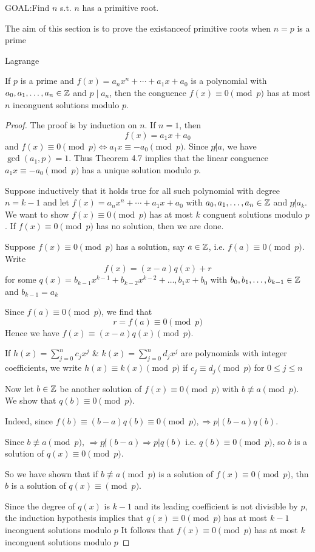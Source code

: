 GOAL:\@ Find $n$ s.t. $n$ has a primitive root.

The aim of this section is to prove the existanceof primitive roots 
when $n = p$ is a prime

\setcounter{theorem}{0}
\begin{theorem}
    Lagrange

    If $p$ is a prime and $f(x) = a_n x^n + \cdots + a_1x + a_0$
    is a polynomial with $a_0, a_1, \dots, a_n \in \mathbb{Z}$ and $p\;|\;a_n$, 
    then the conguence $f(x) \equiv 0 \pmod p$ has at most $n$ inconguent 
    solutions modulo $p$.
\end{theorem}
\begin{proof}
    The proof is by induction on $n$. If $n = 1$, then 
    \[
        f(x) = a_1 x + a_0
    \]
    and $f(x) \equiv 0 \pmod p \iff a_1 x \equiv -a_0 \pmod p$.
    Since $\displaystyle p \not| a$, we have $\gcd(a_1, p) = 1$. Thus
    Theorem 4.7 implies that the linear conguence $a_1 x\equiv -a_0 \pmod p$
    has a unique solution modulo $p$.

    Suppose inductively that it holds true for all such polynomial with degree $n = k-1$
    and let $f(x) = a_n x^n + \cdots + a_1x + a_0$ with $a_0, a_1, \dots, a_n \in \mathbb{Z}$ and
    $p \not| a_k$. We want to show $f(x) \equiv 0 \pmod p$ has at most $k$ conguent solutions
    modulo $p$.
    If $f(x) \equiv 0 \pmod p$ has no solution, then we are done.

    Suppose $f(x) \equiv 0 \pmod p$ has a solution, say $a \in \mathbb{Z}$, i.e. $f(a) \equiv 0 \pmod p$.
    Write
    \[
        f(x) = (x-a)q(x) + r
    \]
    for some $q(x) = b_{k-1} x^{k-1} + b_{k-2} x^{k-2} + \dots, b_1 x + b_0$
    with $b_0, b_1, \dots, b_{k-1} \in \mathbb{Z}$ and $b_{k-1} = a_k$

    Since $f(a) \equiv 0 \pmod p$, we find that 
    \[  
        r = f(a) \equiv 0 \pmod p
    \]
    Hence we have $f(x) \equiv (x-a)q(x) \pmod p$.

    If $h(x) = \sum_{j=0}^{n}{c_j x^j}$ \& $k(x) = \sum_{j=0}^{n}{d_j x^j}$
    are polynomials with integer coefficients, we write $h(x) \equiv k(x) \pmod p$
    if $c_j \equiv d_j \pmod p$ for $0 \leq j \leq n$

    Now let $b \in \mathbb{Z}$ be another solution of $f(x) \equiv 0 \pmod p$ with 
    $b \not\equiv a \pmod p$. We show that $q(b) \equiv 0 \pmod p$.

    Indeed, since $f(b) \equiv (b - a)q(b) \equiv 0 \pmod p, \Rightarrow p| (b-a)q(b)$.

    Since $b \not\equiv a \pmod p$, $\Rightarrow p \not| (b-a) \Rightarrow p | q(b)$
    i.e. $q(b) \equiv 0 \pmod p$, so $b$ is a solution of $q(x) \equiv 0 \pmod p$.

    So we have shown that if $b \not\equiv a \pmod p$ is a solution of $f(x) \equiv 0 \pmod p$,
    thn $b$ is a solution of $q(x) \equiv \pmod p$.

    Since the degree of $q(x)$ is $k-1$ and its leading coefficient is not divisible by $p$, the induction hypothesis
    implies that $q(x) \equiv 0 \pmod p$ has at most 
    $k-1$ inconguent solutions modulo $p$ It follows that $f(x) \equiv 0 \pmod p$ has at most $k$ inconguent solutions modulo $p$
\end{proof}

